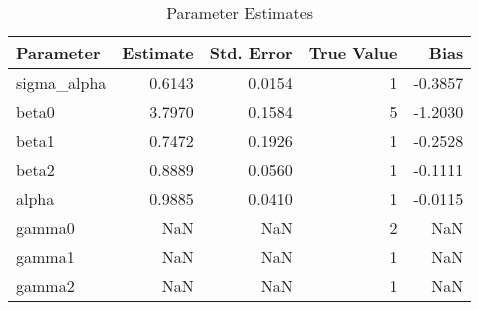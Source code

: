 \begin{table}
\caption{Parameter Estimates}
\begin{tabular}{lrrrr}
\toprule
Parameter & Estimate & Std. Error & True Value & Bias \\
\midrule
sigma_alpha & 0.6143 & 0.0154 & 1 & -0.3857 \\
beta0 & 3.7970 & 0.1584 & 5 & -1.2030 \\
beta1 & 0.7472 & 0.1926 & 1 & -0.2528 \\
beta2 & 0.8889 & 0.0560 & 1 & -0.1111 \\
alpha & 0.9885 & 0.0410 & 1 & -0.0115 \\
gamma0 & NaN & NaN & 2 & NaN \\
gamma1 & NaN & NaN & 1 & NaN \\
gamma2 & NaN & NaN & 1 & NaN \\
\bottomrule
\end{tabular}
\end{table}
